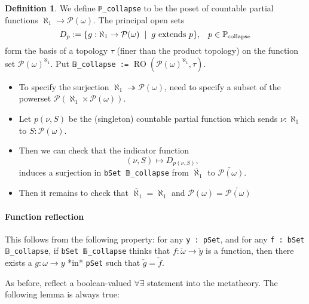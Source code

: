 \documentclass[sigplan,10pt,review, anonymous]{acmart}
\theoremstyle{definition}
\newtheorem{defn}{Definition}[section]
\begin{document}
\begin{defn}\label{def-collapse-poset}
  We define \lstinline{ℙ_collapse} to be the poset of countable partial functions \(\aleph_1 \to \mathcal{P}(\omega)\). The principal open sets \[D_p := \{g : \aleph_1 \to \mathcal{P}(\omega) \hspace{2mm} | \hspace{2mm} g \text{ extends } p\} , \hspace{3mm} p \in \mathbb{P}_{\text{collapse}}\] form the basis of a topology \(\tau\) (finer than the product topology) on the function set \(\mathcal{P}(\omega)^{\aleph_1}\). Put \lstinline{𝔹_collapse :=} \(\operatorname{RO}\left(\mathcal{P}(\omega)^{\aleph_1}, \tau\right)\).
\end{defn}

\begin{itemize}
 \item To specify the surjection \(\aleph_1 \twoheadrightarrow \mathcal{P}(\omega)\), need to specify a subset of the powerset \(\mathcal{P}(\aleph_1 \times \mathcal{P}(\omega))\).

 \item Let \(p(\nu, S)\) be the (singleton) countable partial function which sends \(\nu : \aleph_1\) to \(S : \mathcal{P}(\omega)\).

 \item Then we can check that the indicator function
\[ (\nu, S) \mapsto D_{p(\nu,S)}, \]
induces a surjection in \lstinline{bSet 𝔹_collapse} from \(\check{\aleph_1}\) to \(\check{\mathcal{P}(\omega)}\).

 \item Then it remains to check that \(\check{\aleph_1} = \aleph_1\) and \(\mathcal{P}(\omega) = \check{\mathcal{P}(\omega)}\)
\end{itemize}

\paragraph{Function reflection}

This follows from the following property: for any \lstinline{y : pSet}, and for any \lstinline{f : bSet 𝔹_collapse}, if \lstinline{bSet 𝔹_collapse} thinks that \(f : \check{\omega}  \to \check{y}\) is a function, then there exists a \(g : \omega \to y\) *in* \lstinline{pSet} such that \(\check{g} = \check{f}\).

As before, reflect a boolean-valued \(\forall \exists\) statement into the metatheory. The following lemma is always true:
\end{document}
